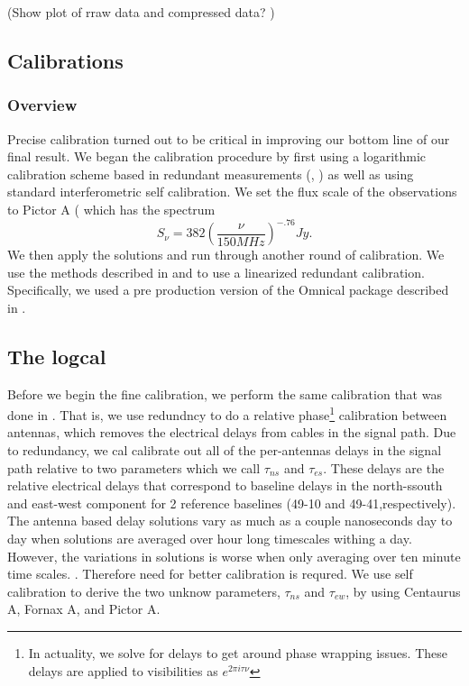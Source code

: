 \documentclass[twocolumn,numberedappendix]{emulateapj}
\begin{document}
(Show plot of rraw data and compressed data? )
\subsection{Calibrations}
\subsubsection{Overview}
Precise calibration turned out to be critical in improving our bottom line of
our final result. We began the calibration procedure by first using a
logarithmic calibration scheme based in redundant measurements
(\citep{liu_et_al2010}, \citep{zheng_et_al2014}) as well as using standard
interferometric self calibration. We set the flux scale of the observations to
Pictor A (\citep{jacobs_et_al_pictor} which has the spectrum 
\begin{equation}
    S_{\nu} = 382(\frac{\nu}{150 MHz})^{-.76} Jy.
\end{equation}
We then apply the solutions and run through another round of calibration. We use
the methods described in \citep{liu_et_al2010} and \citep{zheng_et_al2014} to
use a linearized redundant calibration. Specifically, we used a pre production
version of the Omnical package described in \citep{zhend_et_al2014}.

\subsection{The logcal}
Before we begin the fine calibration, we perform the same calibration that was
done in \citep{parsons2014}. That is, we use redundncy to do a relative
phase\footnote{In actuality, we solve for delays to get around phase wrapping
issues. These delays are applied to visibilities as $e^{2\pi{i}\tau\nu}$}
calibration between antennas, which removes the electrical delays from cables
in the signal path. Due to redundancy, we cal calibrate out all of the
per-antennas delays in the signal path relative to two parameters which we call
$\tau_{ns}$ and $\tau_{es}$. These delays are the relative electrical delays
that correspond to baseline delays in the north-ssouth and east-west component
for 2 reference baselines (49-10 and 49-41,respectively). The antenna based
delay solutions vary as much as a couple nanoseconds day to day when solutions
are averaged over hour long timescales withing a day. However, the variations in
solutions is worse when only averaging over ten minute time scales. . Therefore
need for better calibration is requred.  We use self calibration to derive the
two unknow parameters, $\tau_{ns}$ and $\tau_{ew}$, by using Centaurus A, Fornax
A, and Pictor A.
\end{document}
